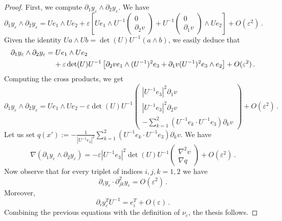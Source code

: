 \documentclass{article}
\theoremstyle{plain}
\theoremstyle{plain}
\theoremstyle{plain}
\theoremstyle{plain}
\theoremstyle{plain}
\theoremstyle{definition}
\theoremstyle{definition}
\begin{document}
\begin{proof}
    First, we compute $\partial_1 y_\varepsilon \wedge \partial_2 y_\varepsilon$. We have
    \[
        \partial_1 y_\varepsilon \wedge \partial_2 y_\varepsilon = Ue_1 \wedge Ue_2 + \varepsilon \left[ Ue_1 \wedge U^{-1}\begin{pmatrix}
            0 \\
            \partial_2 v
        \end{pmatrix} + U^{-1}\begin{pmatrix}
            0 \\ \partial_1 v
        \end{pmatrix} \wedge U e_2 \right] + O(\varepsilon^2) \,.
    \]
    Given the identity $Ua \wedge Ub = \det(U) U^{-1} (a \wedge b)$, we easily deduce that
    \begin{align}
        \partial_1 y_\varepsilon \wedge \partial_2 y_\varepsilon & = Ue_1 \wedge Ue_2 \\
        & \hphantom{=} \, \,+ \varepsilon \det(U) U^{-1} \left[\partial_2 v e_1 \wedge (U^{-1})^2 e_3 + \partial_1 v (U^{-1})^2e_3 \wedge e_2 \right] + O(\varepsilon^2) \,.
    \end{align}
    Computing the cross products, we get
    \[
         \partial_1 y_\varepsilon \wedge \partial_2 y_\varepsilon = Ue_1 \wedge Ue_2 - \varepsilon \det(U) U^{-1} \begin{pmatrix}
            |U^{-1} e_3|^2 \partial_1 v\\
            |U^{-1} e_3|^2 \partial_2 v\\
            -\sum_{k=1}^2 (U^{-1} e_k \cdot U^{-1} e_3) \partial_k v
         \end{pmatrix} + O(\varepsilon^2) \,.
    \]
    Let us set $q(x') := -\frac{1}{|U^{-1}e_3|^2}\sum_{k=1}^2 (U^{-1} e_k \cdot U^{-1} e_3) \partial_k v$. We have 
    \[
        \nabla (\partial_1 y_\varepsilon \wedge \partial_2 y_\varepsilon) = -\varepsilon |U^{-1}e_3|^2 \det(U) U^{-1}\begin{pmatrix}
            \nabla^2 v \\ \nabla q
        \end{pmatrix} + O(\varepsilon^2) \,.
    \]
     Now observe that for every triplet of indices $i, j, k = 1, 2$ we have
    \[
        \partial_i y_\varepsilon \cdot \partial^2_{jk} y_\varepsilon = O(\varepsilon^2) \,.
    \]
    Moreover, 
    \[
        \partial_i y_\varepsilon^T U^{-1} = e_i^T + O(\varepsilon) \,.
    \]
    Combining the previous equations with the definition of $\nu_\varepsilon$, the thesis follows.
\end{proof}
\end{document}
